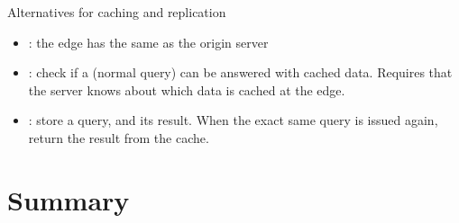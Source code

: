 \begin{slide}{Alternatives for caching and replication}
  \vspace*{-6pt}
  \begin{centerfig}
  \end{centerfig}
  \begin{itemize}\tightlist
  \item {}: the edge has the same as the origin server
  \item {}: check if a (normal query) can be answered with cached data. Requires that
    the server knows about which data is cached at the edge.
  \item {}: store a query, and its result. When the exact same query is issued again,
    return the result from the cache.
  \end{itemize}
\end{slide}
\section{Summary}
